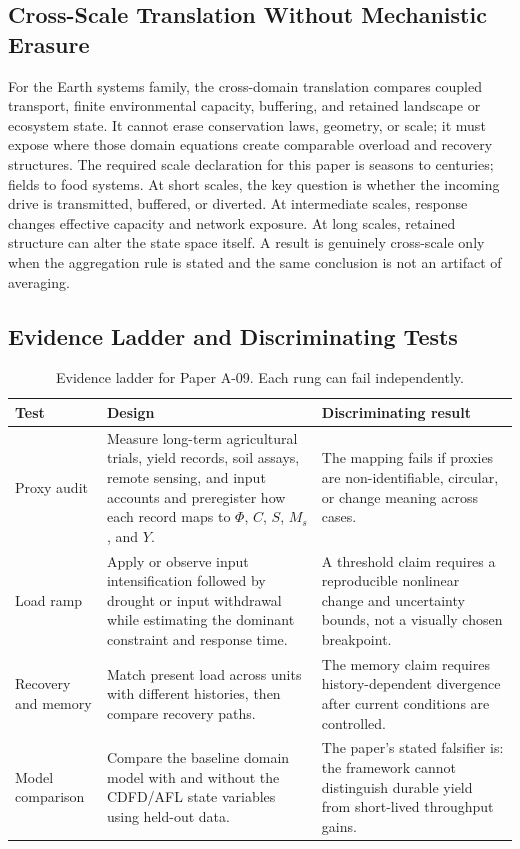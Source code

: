 \documentclass[11pt,a4paper]{article}
\begin{document}
\subsection{Cross-Scale Translation Without Mechanistic Erasure}

For the Earth systems family, the cross-domain translation compares coupled transport, finite environmental capacity, buffering, and retained landscape or ecosystem state. It cannot erase conservation laws, geometry, or scale; it must expose where those domain equations create comparable overload and recovery structures. \cite{Holling1973,Turing1952,BakTangWiesenfeld1987}
The required scale declaration for this paper is seasons to centuries; fields to food systems. At short
scales, the key question is whether the incoming drive is transmitted,
buffered, or diverted. At intermediate scales, response changes effective
capacity and network exposure. At long scales, retained structure can alter the
state space itself. A result is genuinely cross-scale only when the aggregation
rule is stated and the same conclusion is not an artifact of averaging.

\subsection{Evidence Ladder and Discriminating Tests}

\begin{table}[htbp]
\centering
\small
\caption{Evidence ladder for Paper A-09. Each rung can fail independently.}
\begin{tabularx}{\textwidth}{|p{}|X|X|}
\hline
\textbf{Test} & \textbf{Design} & \textbf{Discriminating result} \\
\hline
Proxy audit & Measure long-term agricultural trials, yield records, soil assays, remote sensing, and input accounts and preregister how each record maps to $\Phi$, $C$, $S$, $M_s$, and $Y$. & The mapping fails if proxies are non-identifiable, circular, or change meaning across cases. \\
\hline
Load ramp & Apply or observe input intensification followed by drought or input withdrawal while estimating the dominant constraint and response time. & A threshold claim requires a reproducible nonlinear change and uncertainty bounds, not a visually chosen breakpoint. \\
\hline
Recovery and memory & Match present load across units with different histories, then compare recovery paths. & The memory claim requires history-dependent divergence after current conditions are controlled. \\
\hline
Model comparison & Compare the baseline domain model with and without the CDFD/AFL state variables using held-out data. & The paper's stated falsifier is: the framework cannot distinguish durable yield from short-lived throughput gains. \\
\hline
\end{tabularx}
\end{table}
\end{document}
